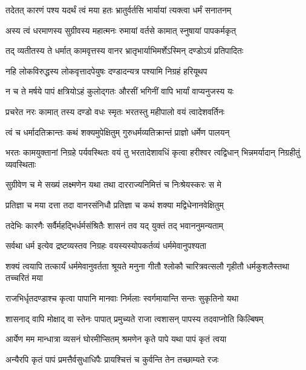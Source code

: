 \twolineshloka
{तदेतत् कारणं पश्य यदर्थं त्वं मया हतः}
{भ्रातुर्वर्तसि भार्यायां त्यक्त्वा धर्मं सनातनम्} %

\twolineshloka
{अस्य त्वं धरमाणस्य सुग्रीवस्य महात्मनः}
{रुमायां वर्तसे कामात् स्नुषायां पापकर्मकृत्} %

\twolineshloka
{तद् व्यतीतस्य ते धर्मात् कामवृत्तस्य वानर}
{भ्रातृभार्याभिमर्शेऽस्मिन् दण्डोऽयं प्रतिपादितः} %

\twolineshloka
{नहि लोकविरुद्धस्य लोकवृत्तादपेयुषः}
{दण्डादन्यत्र पश्यामि निग्रहं हरियूथप} %

\twolineshloka
{न च ते मर्षये पापं क्षत्रियोऽहं कुलोद्गतः}
{औरसीं भगिनीं वापि भार्यां वाप्यनुजस्य यः} %

\twolineshloka
{प्रचरेत नरः कामात् तस्य दण्डो वधः स्मृतः}
{भरतस्तु महीपालो वयं त्वादेशवर्तिनः} %

\twolineshloka
{त्वं च धर्मादतिक्रान्तः कथं शक्यमुपेक्षितुम्}
{गुरुधर्मव्यतिक्रान्तं प्राज्ञो धर्मेण पालयन्} %

\threelineshloka
{भरतः कामयुक्तानां निग्रहे पर्यवस्थितः}
{वयं तु भरतादेशावधिं कृत्वा हरीश्वर}
{त्वद्विधान् भिन्नमर्यादान् निग्रहीतुं व्यवस्थिताः} %

\twolineshloka
{सुग्रीवेण च मे सख्यं लक्ष्मणेन यथा तथा}
{दारराज्यनिमित्तं च निःश्रेयस्करः स मे} %

\twolineshloka
{प्रतिज्ञा च मया दत्ता तदा वानरसंनिधौ}
{प्रतिज्ञा च कथं शक्या मद्विधेनानवेक्षितुम्} %

\twolineshloka
{तदेभिः कारणैः सर्वैर्महद्भिर्धर्मसंश्रितैः}
{शासनं तव यद् युक्तं तद् भवाननुमन्यताम्} %

\twolineshloka
{सर्वथा धर्म इत्येव द्रष्टव्यस्तव निग्रहः}
{वयस्यस्योपकर्तव्यं धर्ममेवानुपश्यता} %

\threelineshloka
{शक्यं त्वयापि तत्कार्यं धर्ममेवानुवर्तता}
{श्रूयते मनुना गीतौ श्लोकौ चारित्रवत्सलौ}
{गृहीतौ धर्मकुशलैस्तथा तच्चरितं मया} %

\twolineshloka
{राजभिर्धृतदण्डाश्च कृत्वा पापानि मानवाः}
{निर्मलाः स्वर्गमायान्ति सन्तः सुकृतिनो यथा} %

\twolineshloka
{शासनाद् वापि मोक्षाद् वा स्तेनः पापात् प्रमुच्यते}
{राजा त्वशासन् पापस्य तदवाप्नोति किल्बिषम्} %

\twolineshloka
{आर्येण मम मान्धात्रा व्यसनं घोरमीप्सितम्}
{श्रमणेन कृते पापे यथा पापं कृतं त्वया} %

\twolineshloka
{अन्यैरपि कृतं पापं प्रमत्तैर्वसुधाधिपैः}
{प्रायश्चित्तं च कुर्वन्ति तेन तच्छाम्यते रजः} %

